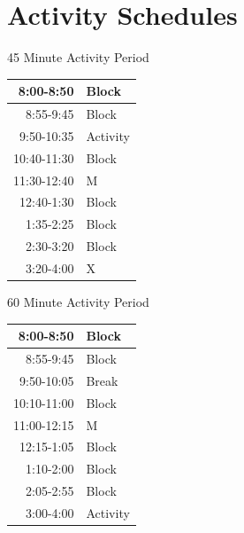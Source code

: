 \section{Activity Schedules}


\begin{minipage}{.5\textwidth}
  \begin{center}
45 Minute Activity Period\\
\begin{tabular}{|r|l|}
    \hline
  8:00-8:50 &Block     \\
    \hline
  8:55-9:45 &Block     \\
    \hline
  9:50-10:35 &Activity \\
    \hline
  10:40-11:30 &Block   \\
    \hline
  11:30-12:40 &M       \\
    \hline
  12:40-1:30 &Block    \\
    \hline
  1:35-2:25 &Block     \\
    \hline
  2:30-3:20 &Block     \\
    \hline
  3:20-4:00 &X         \\
    \hline
\end{tabular}
\end{center}
\end{minipage}
\begin{minipage}{.5\textwidth}
  \begin{center}
60 Minute Activity Period\\
\begin{tabular}{|r|l|}
  \hline
 8:00-8:50 &Block     \\
  \hline
 8:55-9:45 &Block     \\
   \hline
 9:50-10:05 & Break   \\
   \hline
 10:10-11:00 &Block   \\
   \hline
 11:00-12:15 &M       \\
   \hline
 12:15-1:05  &Block   \\
   \hline
 1:10-2:00  &Block    \\
   \hline
 2:05-2:55  &Block    \\
   \hline
 3:00-4:00 &Activity \\ 
   \hline
\end{tabular}
 \end{center}
\end{minipage}

















